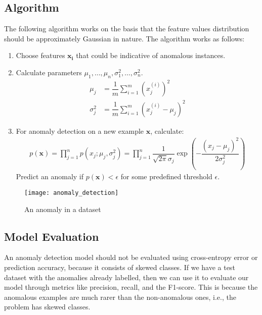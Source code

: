 \documentclass[a4paper, 12pt]{article}
\begin{document}
\subsection{Algorithm}
The following algorithm works on the basis that the feature values distribution should be approximately Gaussian in nature. The algorithm works as follows:
\begin{enumerate}
\item Choose features $\bm{x_i}$ that could be indicative of anomalous instances.
\item Calculate parameters $\mu_1, \dots, \mu_n, \sigma_1^2, \dots, \sigma_n^2$.
\begin{align*}
\mu_j &= \dfrac{1}{m}\sum_{i=1}^{m}\left(x_j^{\left(i\right)}\right)^2 \\
\sigma_j^2 &= \dfrac{1}{m}\sum_{i=1}^{m}\left(x_j^{\left(i\right)} - \mu_j\right)^2
\end{align*}
\item For anomaly detection on a new example $\bm{x}$, calculate:
\begin{align*}
p\left(\bm{x}\right) = \prod_{j=1}^{n}p\left(x_j; \mu_j, \sigma_j^2\right) = \prod_{j=1}^{n}\dfrac{1}{\sqrt{2\pi}\sigma_j}\exp\left(-\dfrac{\left(x_j-\mu_j\right)^2}{2\sigma_j^2}\right)
\end{align*}
Predict an anomaly if $p(\bm{x}) < \epsilon$ for some predefined threshold $\epsilon$.
\end{enumerate}
\begin{figure}[H]
\centering
\texttt{[image: anomaly\_detection]}
\caption{An anomaly in a dataset}
\end{figure}

\subsection{Model Evaluation}
An anomaly detection model should not be evaluated using cross-entropy error or prediction accuracy, because it consists of skewed classes. If we have a test dataset with the anomalies already labelled, then we can use it to evaluate our model through metrics like precision, recall, and the F1-score. This is because the anomalous examples are much rarer than the non-anomalous ones, i.e., the problem has skewed classes.
\end{document}
